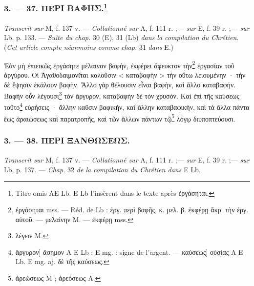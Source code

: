 \documentclass[a4paper, 11pt, oneside, polutonikogreek, french]{article}
\begin{document}
\bigskip
\centerline{\EightStarTaper}
\centerline{\EightStarTaper\EightStarTaper}
\bigskip

\subsubsection[3. --- 37. ΠΕΡΙ ΒΑΦΗΣ.]{3. --- 37. ΠΕΡΙ ΒΑΦΗΣ.\footnote{Titre omis AE Lb. E Lb l'insèrent dans le texte après ἐργάσηται.}}
\paragraph{}
\emph{Transcrit sur} M, f. 137 v. --- \emph{Collationné sur} A, f. 111 r. ;--- \emph{sur} E, f. 39 r. ;--- \emph{sur} Lb, p. 133. --- \emph{Suite du chap.} 30 (E), 31 (Lb) \emph{dans la compilation du Chrétien}. (\emph{Cet article compte néanmoins comme chap.} 31 \emph{dans} E.)

\bigskip

Ἐὰν μὴ ἐπιεικῶς ἐργάσητε μέλαιναν βαφὴν, ἐκφέρει ἄφευκτον τὴν\footnote{ἐργάσηται mss. --- Réd. de Lb : ἐργ. περὶ βαφῆς, κ. μελ. β. ἐκφέρῃ ἄκρ. τὴν ἐργ. αὐτοῦ. --- μελαίνην M. --- ἐκφέρῃ mss.} ἐργασίαν τοῦ ἀργύρου. Οἱ Ἀγαθοδαιμονῖται καλοῦσιν < καταβαφὴν > τὴν οὕτω λειουμένην · τὴν δὲ ἕψησιν ἐκάλουν βαφὴν. Ἄλλο γὰρ θέλουσιν εἶναι βαφὴν, καὶ ἄλλο καταβαφήν. Βαφὴν οὖν λέγουσι\footnote{λέγειν M.} τὸν ἄργυρον, καταβαφὴν δὲ τὸν χρυσόν. Καὶ ἐπὶ τῆς καύσεως τοῦτο\footnote{ἄργυρον] ἄσημον A E Lb ; E mg. : signe de l'argent. --- καύσεως] οὐσίας A E Lb. E mg. aj. δὲ τῆς καύσεως.} εὑρήσεις · ἄλλην καῦσιν βαφικὴν, καὶ ἄλλην καταβαφικὴν, καὶ τὰ ἄλλα πάντα ἕως ἀραιώσεως καὶ παρατροπῆς, καὶ τῶν ἄλλων πάντων τῷ\footnote{ἀρεώσεως M ; ἀρεόσεως A.} λόγῳ διυποπτεύουσι.

\bigskip
\centerline{\EightStarTaper}
\centerline{\EightStarTaper\EightStarTaper}
\bigskip

\subsubsection{3. --- 38. ΠΕΡΙ ΞΑΝΘΩΣΕΩΣ.}
\paragraph{}
\emph{Transcrit sur} M, f. 137 v. --- \emph{Collationné sur} A, f. 111 r. ;--- \emph{sur} E, f. 39 r. ;--- \emph{sur} Lb, p. 137. --- \emph{Chap.} 32 \emph{de la compilation du Chrétien dans} E Lb.

\bigskip
\end{document}
